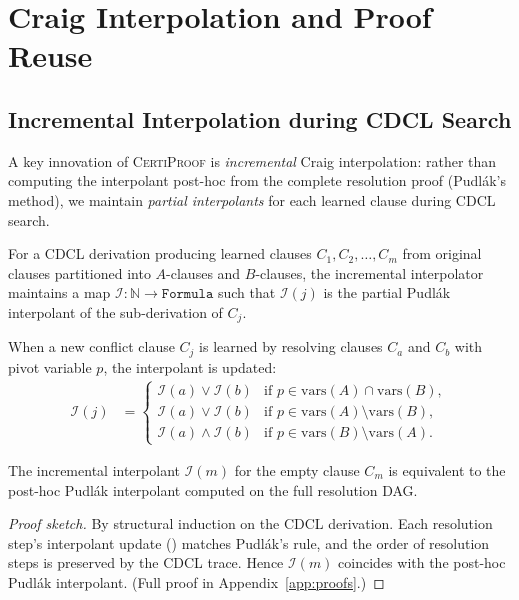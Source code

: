 \documentclass[acmtocl,review,anonymous]{acmart}
\newcommand{\CP}{\textsc{CertiProof}}
\begin{document}
\section{Craig Interpolation and Proof Reuse}
\label{sec:interpolation}

\subsection{Incremental Interpolation during CDCL Search}
\label{sec:incremental-interpolation}

A key innovation of \CP{} is \emph{incremental} Craig interpolation:
rather than computing the interpolant post-hoc from the complete
resolution proof (Pudl\'{a}k's method), we maintain \emph{partial
interpolants} for each learned clause during CDCL search.

\begin{definition}
  \label{def:incr-interpolant}
  For a CDCL derivation producing learned clauses
  $C_1, C_2, \dots, C_m$ from original clauses partitioned into
  $A$-clauses and $B$-clauses, the incremental interpolator maintains
  a map $\mathcal{I} : \mathbb{N} \to \mathtt{Formula}$ such that
  $\mathcal{I}(j)$ is the partial Pudl\'{a}k interpolant of the
  sub-derivation of $C_j$.
\end{definition}

When a new conflict clause $C_j$ is learned by resolving clauses
$C_a$ and $C_b$ with pivot variable $p$, the interpolant is updated:
\begin{align}
  \mathcal{I}(j) &=
  \begin{cases}
    \mathcal{I}(a) \lor \mathcal{I}(b) & \text{if } p \in \mathrm{vars}(A) \cap \mathrm{vars}(B), \\
    \mathcal{I}(a) \lor \mathcal{I}(b) & \text{if } p \in \mathrm{vars}(A) \setminus \mathrm{vars}(B), \\
    \mathcal{I}(a) \land \mathcal{I}(b) & \text{if } p \in \mathrm{vars}(B) \setminus \mathrm{vars}(A).
  \end{cases}
  \label{eq:incr-interpolation}
\end{align}

\begin{theorem}
  \label{thm:incr-correct}
  The incremental interpolant $\mathcal{I}(m)$ for the empty clause
  $C_m$ is equivalent to the post-hoc Pudl\'{a}k interpolant computed
  on the full resolution DAG.
\end{theorem}
\begin{proof}[Proof sketch]
  By structural induction on the CDCL derivation.  Each resolution
  step's interpolant update () matches
  Pudl\'{a}k's rule, and the order of resolution steps is preserved
  by the CDCL trace.  Hence $\mathcal{I}(m)$ coincides with the post-hoc
  Pudl\'{a}k interpolant.
  (Full proof in Appendix~\ref{app:proofs}.)
\end{proof}
\end{document}
